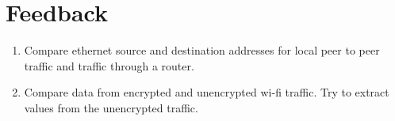 \section{Feedback}\label{sec:feedback}
\begin{enumerate}
	\item Compare ethernet source and destination addresses for local peer to peer traffic and traffic through a router.
	\item Compare data from encrypted and unencrypted wi-fi traffic. Try to extract values from the unencrypted traffic.
\end{enumerate}
